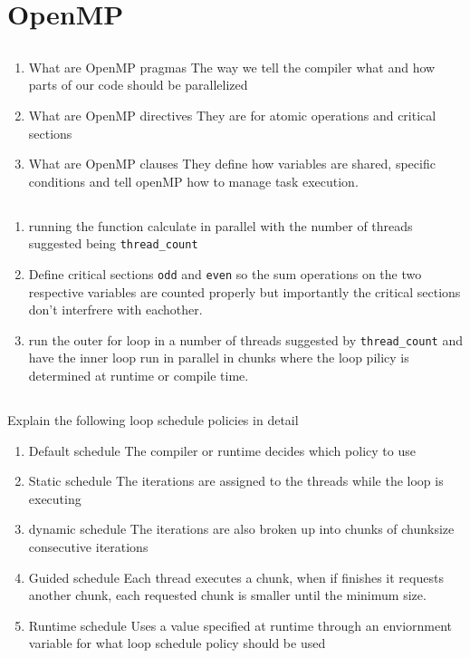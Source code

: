 \documentclass[12pt]{article}
\begin{document}
\section{OpenMP}
\subsection{} 
\begin{enumerate}
	\item What are OpenMP pragmas
	\subitem The way we tell the compiler what and how parts of our code should be parallelized 
	\item What are OpenMP directives
	\subitem They are for atomic operations and critical sections
	\item What are OpenMP clauses
	\subitem They define how variables are shared, specific conditions and tell openMP how to manage task execution.
\end{enumerate}

\subsection{}

\begin{enumerate}
	\item running the function calculate in parallel with the number of threads suggested being \texttt{thread\_count}
	\item Define critical sections \texttt{odd} and \texttt{even} so the sum operations on the two respective variables are counted properly but importantly the critical sections don't interfrere with eachother.
	\item run the outer for loop in a number of threads suggested by \texttt{thread\_count} and have the inner loop run in parallel in chunks where the loop pilicy is determined at runtime or compile time.
\end{enumerate}

\subsection{}
Explain the following loop schedule policies in detail 
\begin{enumerate}
	\item Default schedule
	\subitem The compiler or runtime decides which policy to use
	\item Static schedule
	\subitem The iterations are assigned to the threads while the loop is executing
	\item dynamic schedule 
	\subitem The iterations are also broken up into chunks of chunksize
	consecutive iterations
	\item Guided schedule 
	\subitem Each thread executes a chunk, when if finishes it requests another chunk, each requested chunk is smaller until the minimum size.
	\item Runtime schedule 
	\subitem Uses a value specified at runtime through an enviornment variable for what loop schedule policy should be used 
\end{enumerate}

%
%
\end{document}
